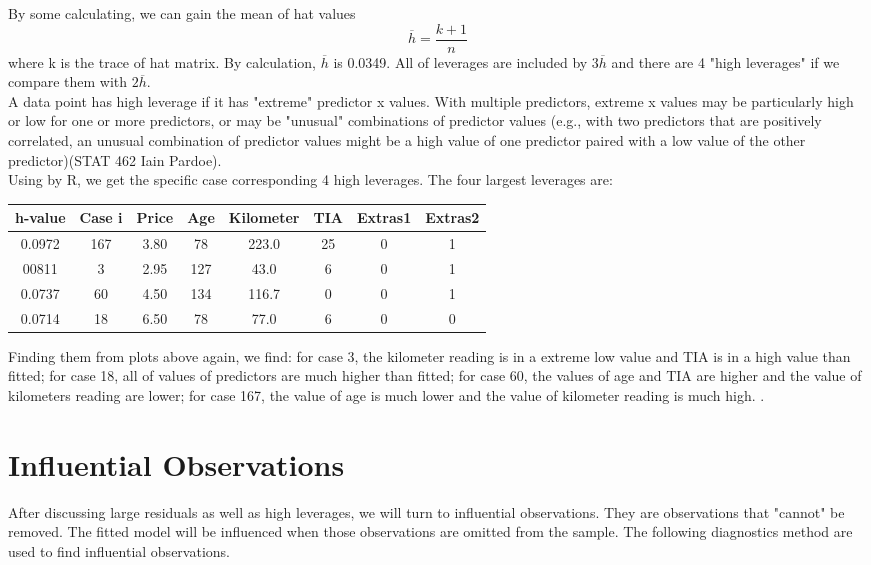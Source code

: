 \documentclass[a4paper]{article}
\begin{document}
\noindent
By some calculating, we can gain the mean of hat values\[\overline{h}=\frac{k+1}{n}\] where k is the trace of hat matrix. By calculation, $\overline{h}$ is 0.0349. All of leverages are included by $3\overline{h}$ and there are 4 "high leverages" if we compare them with $2\overline{h}$. \\

\noindent
A data point has high leverage if it has "extreme" predictor x values. With multiple predictors, extreme x values may be particularly high or low for one or more predictors, or may be "unusual" combinations of predictor values (e.g., with two predictors that are positively correlated, an unusual combination of predictor values might be a high value of one predictor paired with a low value of the other predictor)(STAT 462 Iain Pardoe). \\

\noindent                                                                                                                                                               
Using by R, we get the specific case corresponding 4 high leverages. The four largest leverages are:
\begin{table}[!htb]
\centering
\begin{tabular}{cccccccc}
\toprule
h-value & Case i & Price & Age & Kilometer & TIA & Extras1 & Extras2 \\
\midrule
0.0972  & 167    & 3.80  & 78  & 223.0     & 25  & 0       & 1       \\
00811   & 3      & 2.95  & 127 & 43.0      & 6   & 0       & 1       \\
0.0737  & 60     & 4.50  & 134 & 116.7     & 0   & 0       & 1       \\
0.0714  & 18     & 6.50  & 78  & 77.0      & 6   & 0       & 0       \\
\bottomrule
\end{tabular}
\end{table}

\noindent
Finding them from plots above again, we find: for case 3, the kilometer reading is in a extreme low value and TIA is in a high value than fitted; for case 18, all of values of predictors are much higher than fitted; for case 60, the values of age and TIA are higher and the value of kilometers reading are lower; for case 167, the value of age is much lower and the value of kilometer reading is much high.                     . 



\section{Influential Observations}
After discussing large residuals as well as high leverages, we will turn to influential observations. They are observations that "cannot" be removed. The fitted model will be influenced when those observations are omitted from the sample. The following diagnostics method are used to find influential observations. 
\end{document}
